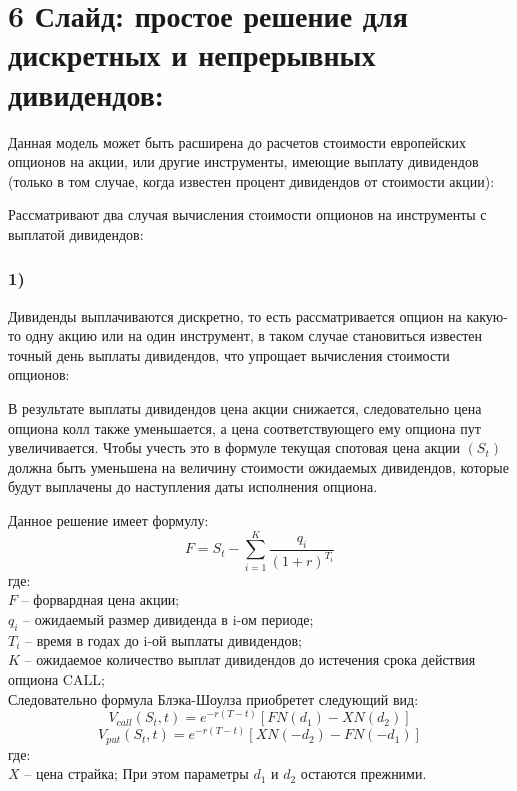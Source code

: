 \documentclass[a4paper]{article}
\begin{document}
\section*{6 Слайд: простое решение для дискретных и непрерывных дивидендов:}
Данная модель может быть расширена до расчетов стоимости европейских опционов на акции, или другие инструменты, имеющие выплату дивидендов (только в том случае, когда известен процент дивидендов от стоимости акции):

Рассматривают два случая вычисления стоимости опционов на инструменты с выплатой дивидендов:
\subsubsection*{1)}
Дивиденды выплачиваются дискретно, то есть рассматривается опцион на какую-то одну акцию или на один инструмент, в таком случае становиться известен точный день выплаты дивидендов, что упрощает вычисления стоимости опционов:

В результате выплаты дивидендов цена акции снижается, следовательно цена опциона колл также уменьшается, а цена соответствующего ему опциона пут увеличивается. Чтобы учесть это в формуле текущая спотовая цена акции $(S_t)$ должна быть уменьшена на величину стоимости ожидаемых дивидендов, которые будут выплачены до наступления даты исполнения опциона.

Данное решение имеет формулу:
\[F = S_t - \sum^K_{i = 1} \dfrac{q_i}{(1 + r)^{T_i}}\]
где: \\
$F$ -- форвардная цена акции; \\
$q_i$ -- ожидаемый размер дивиденда в i-ом периоде; \\
$T_i$ -- время в годах до i-ой выплаты дивидендов; \\
$K$ -- ожидаемое количество выплат дивидендов до истечения срока действия опциона CALL; \\
Следовательно формула Блэка-Шоулза приобретет следующий вид:
\[V_{call}(S_t, t) = e^{-r(T - t)} \left[ F N(d_1) - X N(d_2) \right]\]
\[V_{put}(S_t, t) = e^{-r(T - t)} \left[ X N(-d_2) - F N(-d_1) \right]\]
где:\\
$X$ -- цена страйка; При этом параметры $d_1$ и $d_2$ остаются прежними.
\end{document}
